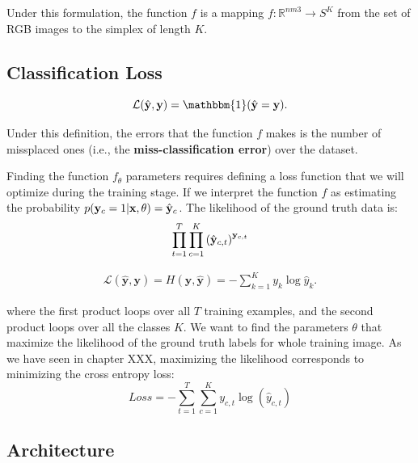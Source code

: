 Under this formulation, the function $f$ is a mapping $f:\mathbb{R}^{nm3} \rightarrow S^K$ from the set of RGB images to the simplex of length $K$. 


\subsection{Classification Loss}


\begin{equation}
    \mathcal{L}(\hat{\mathbf{y}},\mathbf{y}) = \mathbbm{1}(\hat{\mathbf{y}}=\mathbf{y}).
\end{equation}


Under this definition, the errors that the function $f$ makes is the number of missplaced ones (i.e., the {\bf miss-classification error}) over the dataset. 

Finding the function $f_\theta$ parameters requires defining a loss function that we will optimize during the training stage. 
If we interpret the function $f$ as estimating the probability $p({\bf y}_c=1 | {\bf x}, \theta) = \hat {\bf y}_c$. The likelihood of the ground truth data is:
\begin{equation}
\prod_{t=1}^T \prod_{c=1}^K \left( \hat {\bf y}_{c,t} \right) ^{{\bf y}_{c,t}}
\end{equation}

\begin{align}
    \mathcal{L}(\hat{\mathbf{y}},\mathbf{y}) = H(\mathbf{y}, \hat{\mathbf{y}}) = - \sum_{k=1}^K y_k \log \hat{y}_k.
\end{align}

where the first product loops over all $T$ training examples, and the second product loops over all the classes $K$. We want to find the parameters $\theta$ that maximize the likelihood of the ground truth labels for whole training image. As we have seen in chapter XXX, maximizing the likelihood corresponds to minimizing the cross entropy loss:
\begin{equation}
    Loss = - \sum_{t=1}^{T} \sum_{c=1}^{K} y_{c,t} \log (\hat y_{c,t})
\end{equation}


\subsection{Architecture}

